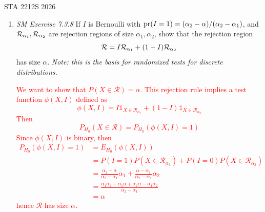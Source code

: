\documentclass[12pt]{article}
\def\Pr{{\rm pr}}
\newcommand{\1}{\mathds 1}
\begin{document}
 {\hfill STA 2212S 2026}\\


\bigskip

\begin{enumerate}

\item {\it SM Exercise 7.3.8} If $I$ is Bernoulli with $\Pr(I=1) = (\alpha_2-\alpha)/(\alpha_2-\alpha_1)$, and ${\cal R}_{\alpha_1}, {\cal R}_{\alpha_2}$ are rejection regions of size $\alpha_1, \alpha_2$, show that the rejection region $${\cal R} = I{\cal R}_{\alpha_1} + (1-I){\cal R}_{\alpha_2}$$ has size $\alpha$. {\it Note: this is the basis for randomized tests for discrete distributions.}

\textcolor{red}{
We want to show that $P(X \in \mathcal R) = \alpha$. This rejection rule implies a test function $\phi(X, I)$ defined as 
\begin{equation*}
    \phi(X, I) = I\1_{X \in \mathcal R_{\alpha_1}} + (1 - I) \1_{X \in \mathcal R_{\alpha_2}}
\end{equation*}
Then 
\begin{equation*}
    P_{H_0} (X \in \mathcal R) = P_{H_0} (\phi(X, I) = 1) 
\end{equation*}
Since $\phi(X, I)$ is binary, then 
\begin{align*}
    P_{H_0}(\phi(X, I) = 1) &= E_{H_0} (\phi(X, I))\\
    &= P(I = 1)P(X \in \mathcal R_{\alpha_1}) + P(I = 0) P(X \in \mathcal R_{\alpha_2})\\
    &= \frac{\alpha_2 - \alpha}{\alpha_2 - \alpha_1} \alpha_1 + \frac{\alpha - \alpha_1}{\alpha_2 - \alpha_1} \alpha_2\\
    &= \frac{\alpha_1\alpha_2 - \alpha_1\alpha + \alpha_2\alpha -\alpha_1\alpha_2}{\alpha_2 - \alpha_1}\\
    &= \alpha
\end{align*}
hence $\mathcal R$ has size $\alpha$. 
}


\end{enumerate}
\end{document}
